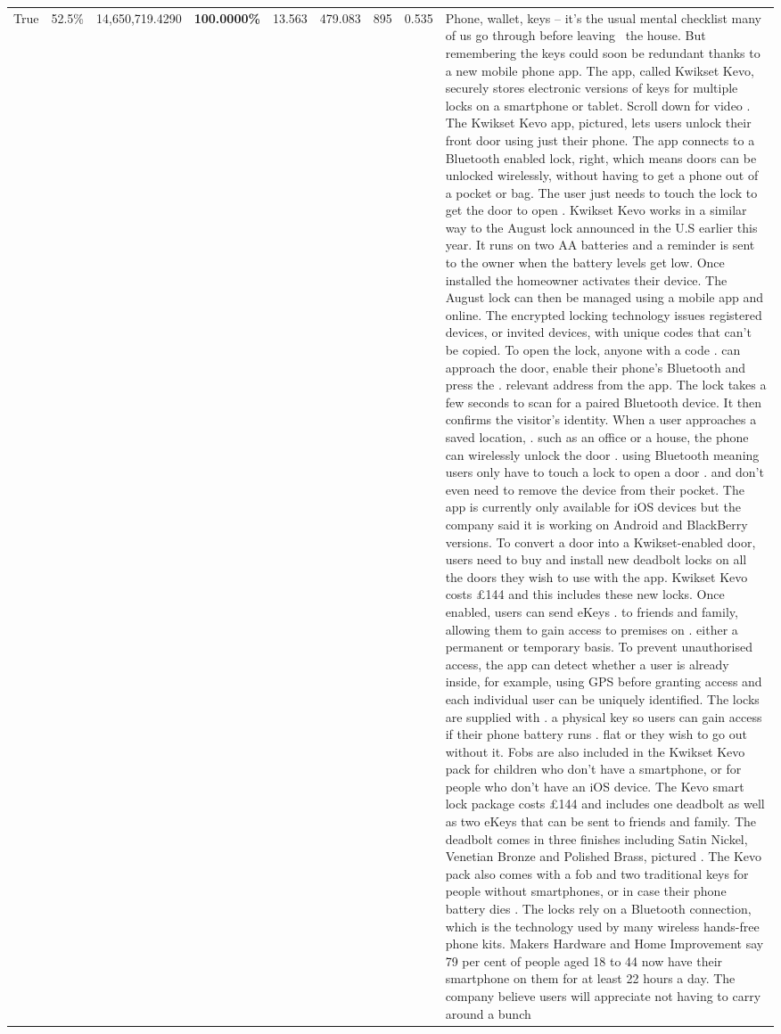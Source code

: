 \begin{table}[H]
\begin{tabular}{lllrlllll}
True & 52.5\% & 14,650,719.4290 & \bfseries \color{red} 100.0000\% & 13.563 & 479.083 & 895 & 0.535 & Phone, wallet, keys – it’s the usual mental checklist many of us go through before leaving  the house. But remembering the keys could soon be redundant thanks to a new mobile phone app. The app, called Kwikset Kevo, securely stores electronic versions of keys for multiple locks on a smartphone or tablet. Scroll down for video . The Kwikset Kevo app, pictured, lets users unlock their front door using just their phone. The app connects to a Bluetooth enabled lock, right, which means doors can be unlocked wirelessly, without having to get a phone out of a pocket or bag. The user just needs to touch the lock to get the door to open . Kwikset Kevo works in a similar way to the August lock announced in the U.S earlier this year. It runs on two AA batteries and a reminder is sent to the owner when the battery levels get low. Once installed the homeowner activates their device. The August lock can then be managed using a mobile app and online. The encrypted locking technology issues registered devices, or invited devices, with unique codes that can't be copied. To open the lock, anyone with a code . can approach the door, enable their phone's Bluetooth and press the . relevant address from the app. The lock takes a few seconds to scan for a paired Bluetooth device. It then confirms the visitor's identity. When a user approaches a saved location, . such as an office or a house, the phone can wirelessly unlock the door . using Bluetooth meaning users only have to touch a lock to open a door . and don't even need to remove the device from their pocket. The app is currently only available for iOS devices but the company said it is working on Android and BlackBerry versions. To convert a door into a Kwikset-enabled door, users need to buy and install new deadbolt locks on all the doors they wish to use with the app. Kwikset Kevo costs £144 and this includes these new locks. Once enabled, users can send eKeys . to friends and family, allowing them to gain access to premises on . either a permanent or temporary basis. To prevent unauthorised access, the app can detect whether a user is already inside, for example, using GPS before granting access and each individual user can be uniquely identified. The locks are supplied with . a physical key so users can gain access if their phone battery runs . flat or they wish to go out without it. Fobs are also included in the Kwikset Kevo pack for children who don't have a smartphone, or for people who don't have an iOS device. The Kevo smart lock package costs £144 and includes one deadbolt as well as two eKeys that can be sent to friends and family. The deadbolt comes in three finishes including Satin Nickel, Venetian Bronze and Polished Brass, pictured . The Kevo pack also comes with a fob and two traditional keys for people without smartphones, or in case their phone battery dies . The locks rely on a Bluetooth connection, which is the technology used by many wireless hands-free phone kits. Makers Hardware and Home Improvement say 79 per cent of people aged 18 to 44 now have their smartphone on them for at least 22 hours a day. The company believe users will appreciate not having to carry around a bunch 
\end{tabular}
\end{table}
